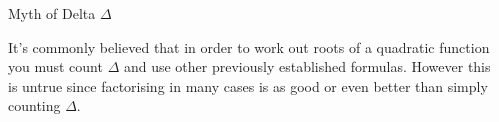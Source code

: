 \documentclass[final]{beamer}
\newlength{\sepwid}
\newlength{\onecolwid}
\newlength{\twocolwid}
\begin{document}
\begin{frame}[t]
\begin{columns}[t]
        \begin{column}{\sepwid}\end{column} %

        \begin{column}{\twocolwid} %

            \begin{columns}[t,totalwidth=\twocolwid] %

                \begin{column}{\onecolwid}\vspace{-.6in} %


                \end{column} %

                \begin{column}{\onecolwid}\vspace{-.6in} %

                    

                \end{column} %

            \end{columns} %


            \begin{alertblock}{Myth of Delta $\Delta$}

                It's commonly believed that in order to work out roots of a quadratic function you must count $\Delta$ and use other previously established formulas. However this is untrue since factorising in many cases is as good or even better than simply counting $\Delta$.

            \end{alertblock}


            \begin{columns}[t,totalwidth=\twocolwid] %


\end{columns}
\end{column}
\end{columns}
\end{frame}
\end{document}
